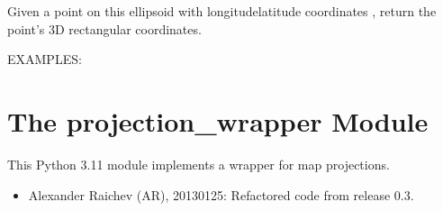 \documentclass[a4paper,12ptopenany,oneside,english]{sphinxmanual}
\begin{document}
\begin{fulllineitems}

\begin{fulllineitems}
\label{\detokenize{ellipsoids:rhealpixdggs.ellipsoids.Ellipsoid.xyz}}
\pysigstartsignatures
\pysiglinewithargsret
{}
{\sphinxparamcomma {}}
{}
\pysigstopsignatures
\sphinxAtStartPar
Given a point on this ellipsoid with longitude\sphinxhyphen{}latitude coordinates
, return the point’s 3D rectangular coordinates.

\sphinxAtStartPar
EXAMPLES:

\begin{sphinxVerbatim}[commandchars=\\\{\}]
  
      
\end{sphinxVerbatim}

\end{fulllineitems}


\end{fulllineitems}


\sphinxstepscope


\chapter{The projection\_wrapper Module}
\label{\detokenize{projection_wrapper:module-rhealpixdggs.projection_wrapper}}\label{\detokenize{projection_wrapper:the-projection-wrapper-module}}\label{\detokenize{projection_wrapper::doc}}
\sphinxAtStartPar
This Python 3.11 module implements a wrapper for map projections.
\begin{itemize}
\item {} 
\sphinxAtStartPar
Alexander Raichev (AR), 2013\sphinxhyphen{}01\sphinxhyphen{}25: Refactored code from release 0.3.

\end{itemize}
\end{document}
